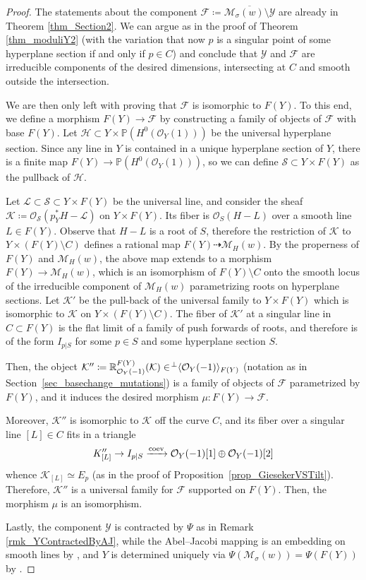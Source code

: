 \documentclass[11pt]{amsart}
\theoremstyle{definition}
\newcommand{\sH}{\mathcal{H}}
\newcommand{\sO}{\mathcal{O}}
\newcommand{\sK}{\mathcal{K}}
\newcommand{\sY}{\mathcal{Y}}
\newcommand{\sL}{\mathcal{L}}
\newcommand{\sS}{\mathcal{S}}
\newcommand{\sM}{\mathcal{M}}
\newcommand{\sF}{\mathcal{F}}
\DeclarePairedDelimiter{\pair}{\langle}{\rangle}
\begin{document}
\begin{proof}
The statements about the component $\sF\coloneqq \overline{\sM_\sigma(w)\setminus \sY}$ are already in Theorem \ref{thm_Section2}. We can argue as in the proof of Theorem \ref{thm_moduliY2} (with the variation that now $p$ is a singular point of some hyperplane section if and only if $p\in C$) and conclude that $\sY$ and $\sF$ are irreducible components of the desired dimensions, intersecting at $C$ and smooth outside the intersection. 

We are then only left with proving that $\sF$ is isomorphic to $F(Y)$. To this end, we define a morphism $F(Y)\to \sF$ by constructing a family of objects of $\sF$ with base $F(Y)$.  Let $\sH\subset Y\times \mathbb P(H^0(\sO_Y(1)))$ be the universal hyperplane section. Since any line in $Y$ is contained in a unique hyperplane section of $Y$, there is a finite map $F(Y)\to \mathbb P(H^0(\sO_Y(1)))$, so we can define $\sS\subset Y\times F(Y)$ as the pullback of $\sH$. 

Let $\sL\subset\sS\subset Y\times F(Y)$ be the universal line, and consider the sheaf $\sK\coloneqq \sO_\sS(p_Y^\ast H-\sL)$ on $Y\times F(Y)$.
Its fiber is $\sO_S(H-L)$  over a smooth line $L\in F(Y)$. Observe that $H-L$ is a root of $S$, therefore the restriction of $\sK$ to $Y\times (F(Y)\setminus C)$ defines a rational map $F(Y)\dashrightarrow \sM_H(w)$. By the properness of $F(Y)$ and $\sM_H(w)$, the above map extends to a morphism $F(Y)\to \sM_H(w)$, which is an isomorphism of $F(Y)\setminus C$ onto the smooth locus of the irreducible component of $\sM_H(w)$ parametrizing roots on hyperplane sections. Let $\sK'$ be the pull-back of the universal family to $Y\times F(Y)$ which is isomorphic to $\sK$ on $Y\times (F(Y)\setminus C)$. The fiber of $\sK'$ at a singular line in $C\subset F(Y)$ is the flat limit of a family of push forwards of roots, and therefore is of the form $I_{p|S}$ for some $p\in S$ and some hyperplane section $S$. 

Then, the object $\sK''\coloneqq \mathbb R_{\sO_Y(-1)}^{F(Y)}(\sK)\in \!^\perp\pair{\sO_Y(-1)}_{F(Y)}$ (notation as in Section~\ref{sec_basechange_mutations}) is a family of objects of $\sF$ parametrized by $F(Y)$, and it induces the desired morphism $\mu\colon F(Y)\to \sF$.

Moreover, $\sK''$ is isomorphic to $\sK$ off the curve $C$, and its fiber over a singular line $[L]\in C$ fits in a triangle
\[ \mathcal \sK''_{[L]} \to I_{p|S} \xrightarrow{\mathrm{coev}} \sO_Y(-1)[1]\oplus \sO_Y(-1)[2] \]
whence $\sK_{[L]}\simeq E_p$ (as in the proof of Proposition~\ref{prop_GiesekerVSTilt}). Therefore, $\sK''$ is a universal family for $\sF$ supported on $F(Y)$. Then, the morphism $\mu$ is an isomorphism.

Lastly, the component $\sY$ is contracted by $\Psi$ as in Remark \ref{rmk_YContractedByAJ}, while the Abel--Jacobi mapping is an embedding on smooth lines by \cite[\S 10]{Tih82}, and $Y$ is determined uniquely via $\Psi(\sM_\sigma(w))=\Psi(F(Y))$ by \cite[Thm.~12]{Tih82}.
\end{proof}
\end{document}
